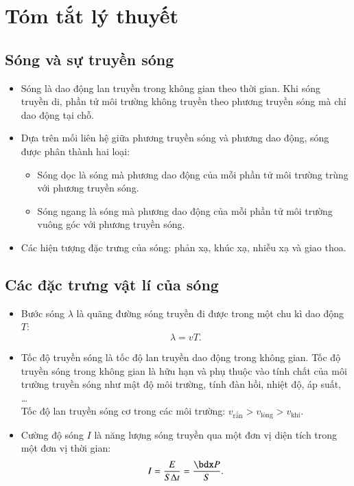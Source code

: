 \chapter{Tóm tắt lý thuyết}
\section{Sóng và sự truyền sóng}
\begin{itemize}
	\item Sóng là dao động lan truyền trong không gian theo thời gian. Khi sóng truyền di, phần tử môi trường không truyền theo phương truyền sóng mà chỉ dao động tại chỗ.
	\item Dựa trên mối liên hệ giữa phương truyền sóng và phương dao động, sóng được phân thành hai loại:
	\begin{itemize}
		\item Sóng dọc là sóng mà phương dao động của mỗi phần tử môi trường trùng với phương truyền sóng.
		\item Sóng ngang là sóng mà phương dao động của mỗi phần tử môi trường vuông góc với phương truyền sóng.
	\end{itemize}
\item Các hiện tượng đặc trưng của sóng: phản xạ, khúc xạ, nhiễu xạ và giao thoa.
\end{itemize}
\section{Các đặc trưng vật lí của sóng}
\begin{itemize}
	\item Bước sóng $\lambda$ là quãng đường sóng truyền đi được trong một chu kì dao động $T$:
	$$\lambda=vT.$$
	\item Tốc độ truyền sóng là tốc độ lan truyền dao động trong không gian. Tốc độ truyền sóng trong không gian là hữu hạn và phụ thuộc vào tính chất của môi trường truyền sóng như mật độ môi trường, tính đàn hồi, nhiệt độ, áp suất, \dots\\
	Tốc độ lan truyền sóng cơ trong các môi trường: $v_\text{rắn}>v_\text{lỏng}>v_\text{khí}$.
	\item Cường độ sóng $I$ là năng lượng sóng truyền qua một đơn vị diện tích trong một đơn vị thời gian:
	$$I=\dfrac{E}{S\Delta t}=\dfrac{\calP}{S}.$$
\end{itemize}
